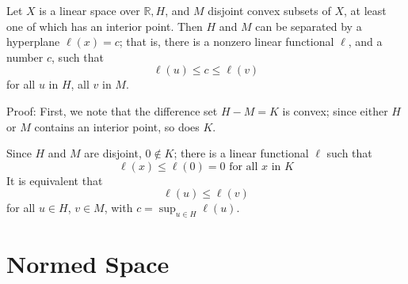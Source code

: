 \documentclass[12pt, oneside]{book}
\begin{document}
\begin{theorem}
    Let $X$ is a linear space over $\mathbb{R}, H$, and $M$ disjoint convex subsets of $X$, at least one of which has an interior point. Then $H$ and $M$ can be separated by a hyperplane $\ell(x)=c$; that is, there is a nonzero linear functional $\ell$, and a number $c$, such that
    \begin{equation*}
        \ell(u) \leq c \leq \ell(v)
    \end{equation*}
    for all $u$ in $H$, all $v$ in $M$.

    Proof:
    First, we note that the difference set $H-M=K$ is convex; since either $H$ or $M$ contains an interior point, so does $K$.

    Since $H$ and $M$ are disjoint, $0 \notin K$; there is a linear functional $\ell$ such that
    \begin{equation*}
        \ell(x) \leq \ell(0)=0 \text { for all } x \text { in } K
    \end{equation*}
    It is equivalent that
    \begin{equation*}
        \ell(u) \leq \ell(v)
    \end{equation*}
    for all $u\in H$, $v\in M$, with $c=\sup _{u \in H} \ell(u)$.
\end{theorem}












\chapter{Normed Space}
\end{document}
